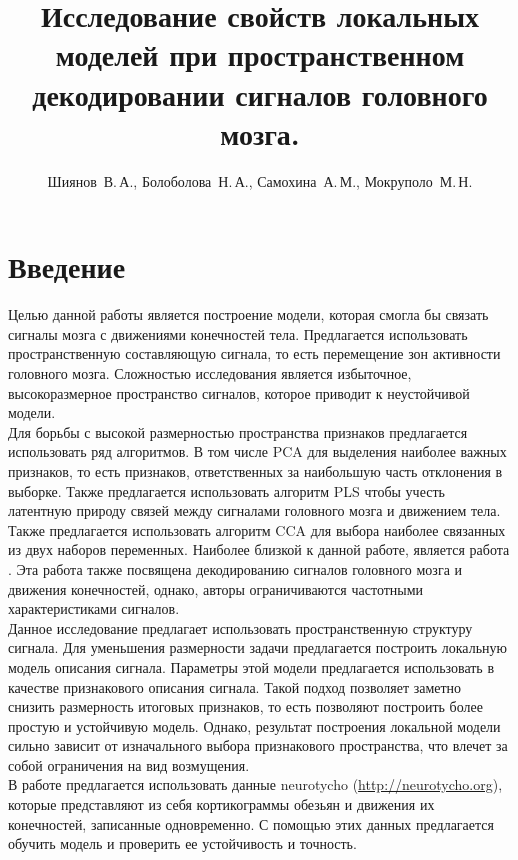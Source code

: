 \documentclass[12pt,twoside]{article}
\title
    [Локальные модели при декодировании сигналов головного мозга]
    {Исследование свойств локальных моделей при пространственном декодировании сигналов головного мозга.}
\author
    [Шиянов~В.\,А.]
    {Шиянов~В.\,А., Болоболова~Н.\,А., Самохина~А.\,М., Мокруполо~М.\,Н.}
\begin{document}
\maketitle
\section{Введение}
Целью данной работы является построение модели, которая смогла бы связать сигналы мозга с движениями конечностей тела. Предлагается использовать пространственную составляющую сигнала, то есть перемещение зон активности головного мозга. Сложностью исследования является избыточное, высокоразмерное пространство сигналов, которое приводит к неустойчивой модели.\\
Для борьбы с высокой размерностью пространства признаков предлагается использовать ряд алгоритмов. В том числе PCA \cite{Jolliffe2011} для выделения наиболее важных признаков, то есть признаков, ответственных за наибольшую часть отклонения в выборке. Также предлагается использовать алгоритм PLS \cite{Haenlein2004} чтобы учесть латентную природу связей между сигналами головного мозга и движением тела. Также предлагается использовать алгоритм CCA \cite{thompson2005canonical} для выбора наиболее связанных из двух наборов переменных. Наиболее близкой к данной работе, является работа \cite{Motrenko_2018}. Эта работа также посвящена декодированию сигналов головного мозга и движения конечностей, однако, авторы ограничиваются частотными характеристиками сигналов.\\
Данное исследование предлагает использовать пространственную структуру сигнала. Для уменьшения размерности задачи предлагается построить локальную модель описания сигнала. Параметры этой модели предлагается использовать в качестве признакового описания сигнала. Такой подход позволяет заметно снизить размерность итоговых признаков, то есть позволяют построить более простую и устойчивую модель. Однако, результат построения локальной модели сильно зависит от изначального выбора признакового пространства, что влечет за собой ограничения на вид возмущения.\\
В работе предлагается использовать данные neurotycho (\url{http://neurotycho.org}), которые представляют из себя кортикограммы обезьян и движения их конечностей, записанные одновременно. С помощью этих данных предлагается обучить модель и проверить ее устойчивость и точность.
\end{document}
